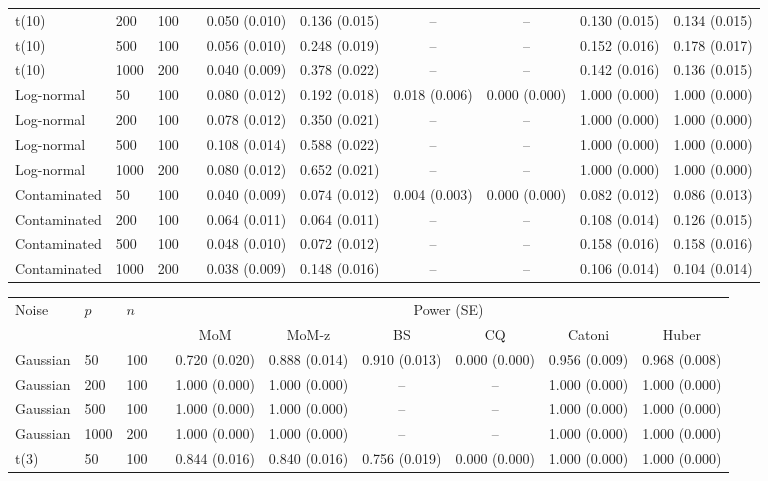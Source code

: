 \begin{table}[t]
\begin{tabular}{llllcccccc}
t(10) & 200 & 100 & & 0.050 (0.010) & 0.136 (0.015) & -- & -- & 0.130 (0.015) & 0.134 (0.015) \\
t(10) & 500 & 100 & & 0.056 (0.010) & 0.248 (0.019) & -- & -- & 0.152 (0.016) & 0.178 (0.017) \\
t(10) & 1000 & 200 & & 0.040 (0.009) & 0.378 (0.022) & -- & -- & 0.142 (0.016) & 0.136 (0.015) \\
Log-normal & 50 & 100 & & 0.080 (0.012) & 0.192 (0.018) & 0.018 (0.006) & 0.000 (0.000) & 1.000 (0.000) & 1.000 (0.000) \\
Log-normal & 200 & 100 & & 0.078 (0.012) & 0.350 (0.021) & -- & -- & 1.000 (0.000) & 1.000 (0.000) \\
Log-normal & 500 & 100 & & 0.108 (0.014) & 0.588 (0.022) & -- & -- & 1.000 (0.000) & 1.000 (0.000) \\
Log-normal & 1000 & 200 & & 0.080 (0.012) & 0.652 (0.021) & -- & -- & 1.000 (0.000) & 1.000 (0.000) \\
Contaminated & 50 & 100 & & 0.040 (0.009) & 0.074 (0.012) & 0.004 (0.003) & 0.000 (0.000) & 0.082 (0.012) & 0.086 (0.013) \\
Contaminated & 200 & 100 & & 0.064 (0.011) & 0.064 (0.011) & -- & -- & 0.108 (0.014) & 0.126 (0.015) \\
Contaminated & 500 & 100 & & 0.048 (0.010) & 0.072 (0.012) & -- & -- & 0.158 (0.016) & 0.158 (0.016) \\
Contaminated & 1000 & 200 & & 0.038 (0.009) & 0.148 (0.016) & -- & -- & 0.106 (0.014) & 0.104 (0.014) \\
\bottomrule
\end{tabular}
\vspace{6pt}
\begin{tabular}{llllcccccc}
\toprule
Noise & $p$ & $n$ & & \multicolumn{6}{c}{Power (SE)} \\
\cmidrule{5-10}
 & & & & MoM & MoM-z & BS & CQ & Catoni & Huber \\
\midrule
Gaussian & 50 & 100 & & 0.720 (0.020) & 0.888 (0.014) & 0.910 (0.013) & 0.000 (0.000) & 0.956 (0.009) & 0.968 (0.008) \\
Gaussian & 200 & 100 & & 1.000 (0.000) & 1.000 (0.000) & -- & -- & 1.000 (0.000) & 1.000 (0.000) \\
Gaussian & 500 & 100 & & 1.000 (0.000) & 1.000 (0.000) & -- & -- & 1.000 (0.000) & 1.000 (0.000) \\
Gaussian & 1000 & 200 & & 1.000 (0.000) & 1.000 (0.000) & -- & -- & 1.000 (0.000) & 1.000 (0.000) \\
t(3) & 50 & 100 & & 0.844 (0.016) & 0.840 (0.016) & 0.756 (0.019) & 0.000 (0.000) & 1.000 (0.000) & 1.000 (0.000) \\

\end{tabular}
\end{table}
